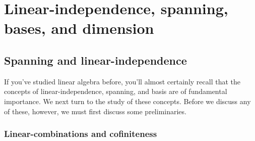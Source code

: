 \chapter[Lin.-ind., span, bases, and dimension]{Linear-independen\-ce, spanning, bases, and dimension}\label{chpBases}

\section{Spanning and linear-independence}

If you've studied linear algebra before, you'll almost certainly recall that the concepts of linear-independence, spanning, and basis are of fundamental importance.  We next turn to the study of these concepts.  Before we discuss any of these, however, we must first discuss some preliminaries.

\subsection{Linear-combinations and cofiniteness}\label{sbs2.1.1}

